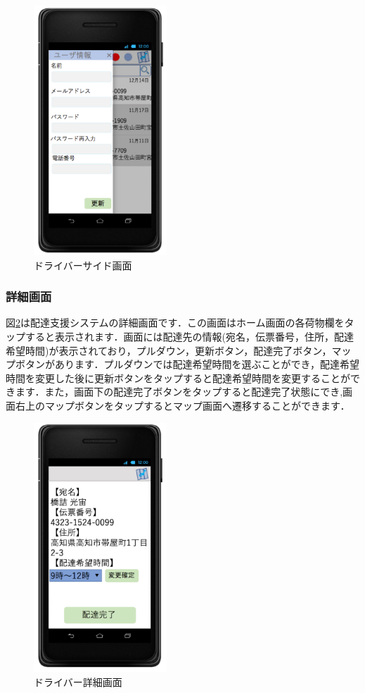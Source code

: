 \documentclass[a4j,titlepage]{jarticle}
\begin{document}
\begin{figure}[htbp]
 \begin{center}
  \includegraphics[width=50mm]{driver_side.pdf}
	\caption{ドライバーサイド画面}
	\label{fig:driver_side}
 \end{center}

\end{figure}

\subsubsection{詳細画面}
図\ref{fig:driver_details}は配達支援システムの詳細画面です．この画面はホーム画面の各荷物欄をタップすると表示されます．画面には配達先の情報(宛名，伝票番号，住所，配達希望時間)が表示されており，プルダウン，更新ボタン，配達完了ボタン，マップボタンがあります．プルダウンでは配達希望時間を選ぶことができ，配達希望時間を変更した後に更新ボタンをタップすると配達希望時間を変更することができます．また，画面下の配達完了ボタンをタップすると配達完了状態にでき,画面右上のマップボタンをタップするとマップ画面へ遷移することができます．
\begin{figure}[htbp]
 \begin{center}
  \includegraphics[width=50mm]{driver_details.pdf}
	\caption{ドライバー詳細画面}
	\label{fig:driver_details}
 \end{center}

\end{figure}
\end{document}
